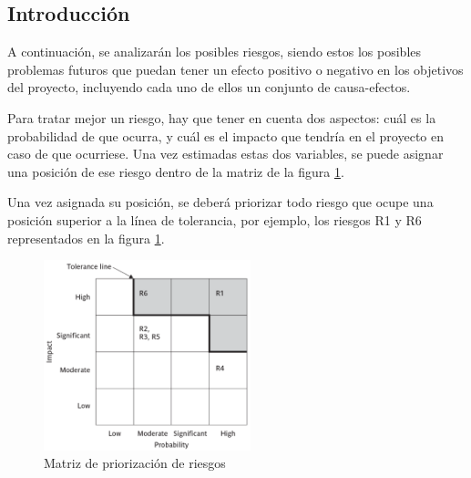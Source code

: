     \subsection{Introducción}
        A continuación, se analizarán los posibles riesgos, siendo estos los posibles problemas futuros que puedan tener un efecto positivo o negativo en los objetivos del proyecto, incluyendo cada uno de ellos un conjunto de causa-efectos.
        
        Para tratar mejor un riesgo, hay que tener en cuenta dos aspectos: cuál es la probabilidad de que ocurra, y cuál es el impacto que tendría en el proyecto en caso de que ocurriese.
        Una vez estimadas estas dos variables, se puede asignar una posición de ese riesgo dentro de la matriz de la figura \ref{fig:riskmatrix}.
        
        Una vez asignada su posición, se deberá priorizar todo riesgo que ocupe una posición superior a la línea de tolerancia, por ejemplo, los riesgos R1 y R6 representados en la figura \ref{fig:riskmatrix}.
        
        \begin{figure}[H]
            \centering
            \includegraphics[width=6cm]{./img/spm/riskmatrix.png}
            \caption{Matriz de priorización de riesgos}
            \label{fig:riskmatrix}
        \end{figure}

\newpage

